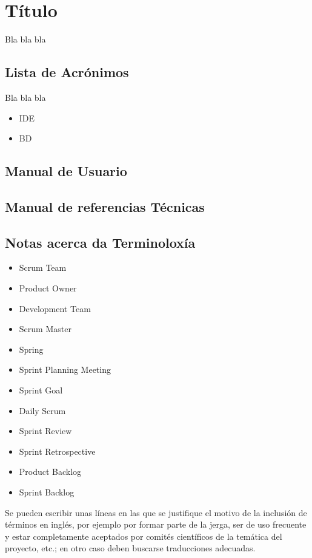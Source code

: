\chapter{Título}

Bla bla bla

\section{Lista de Acrónimos}

  Bla bla bla
\begin{itemize}
 \item {IDE}
 \item {BD}
\end{itemize}


\section{Manual de Usuario}

\section{Manual de referencias Técnicas}

\section{Notas acerca da Terminoloxía}
\begin{itemize}
	\item{Scrum Team}
	\item{Product Owner}
	\item{Development Team}
	\item{Scrum Master}
	\item{Spring}
	\item{Sprint Planning Meeting}
	\item{Sprint Goal}
	\item{Daily Scrum}
	\item{Sprint Review}
	\item{Sprint Retrospective}
	\item{Product Backlog}
	\item{Sprint Backlog}
	
	
\end{itemize}

  Se pueden escribir unas líneas en las que se justifique
  el motivo de la inclusión de términos en inglés, por ejemplo por formar parte de la
  jerga, ser de uso frecuente y estar completamente aceptados por comités científicos de
  la temática del proyecto, etc.; en otro caso deben buscarse traducciones adecuadas.
